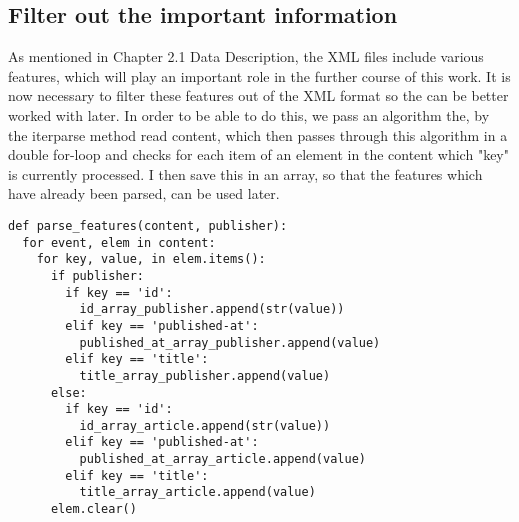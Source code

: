 \documentclass[a4paper, 11pt,titlepage,oneside,openany]{book}
\begin{document}
\subsection{Filter out the important information}
As mentioned in Chapter 2.1 Data Description, the XML files include various features, which will play an important role in the further course of this work. It is now necessary to filter these features out of the XML format so the can be better worked with later. In order to be able to do this, we pass an algorithm the, by the iterparse method read content, which then passes through this algorithm in a double for-loop and checks for each item of an element in the content which "key" is currently processed. I then save this in an array, so that the features which have already been parsed, can be used later. \\
\noindent
\begin{minipage}{\linewidth}
\begin{lstlisting}[frame=single]
def parse_features(content, publisher):
  for event, elem in content:
    for key, value, in elem.items():
      if publisher:
        if key == 'id':
          id_array_publisher.append(str(value))
        elif key == 'published-at':
          published_at_array_publisher.append(value)
        elif key == 'title':
          title_array_publisher.append(value)
      else:
        if key == 'id':
          id_array_article.append(str(value))
        elif key == 'published-at':
          published_at_array_article.append(value)
        elif key == 'title':
          title_array_article.append(value)
      elem.clear()
\end{lstlisting}
\end{minipage}
\end{document}
